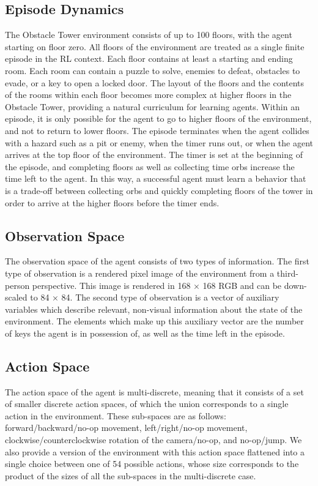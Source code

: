 \documentclass[conference]{IEEEtran}
\begin{document}
\subsection{\textbf{Episode Dynamics}}
The Obstacle Tower environment consists of up to 100 floors, with the agent starting on floor zero. All floors of the environment are treated as a single finite episode in the RL context. Each floor contains at least a starting and ending room. Each room can contain a puzzle to solve, enemies to defeat, obstacles to evade, or a key to open a locked door. The layout of the floors and the contents of the rooms within each floor becomes more complex at higher floors in the Obstacle Tower, providing a natural curriculum for learning agents. Within an episode, it is only possible for the agent to go to higher floors of the environment, and not to return to lower floors.
The episode terminates when the agent collides with a hazard such as a pit or enemy, when the timer runs out, or when the agent arrives at the top floor of the environment. The timer is set at the beginning of the episode, and completing floors as well as collecting time orbs increase the time left to
the agent. In this way, a successful agent must learn a behavior that is a trade-off between collecting orbs and quickly completing floors of the tower in order to arrive at the higher floors before the timer ends.

\subsection{\textbf{Observation Space}}
The observation space of the agent consists of two types of information. The first type of observation is a rendered pixel image of the environment from a third-person perspective.
This image is rendered in 168 × 168 RGB and can be down-scaled to 84 × 84. The second type of observation is a vector of auxiliary variables which describe relevant, non-visual information about the state of the environment. The elements which make up this auxiliary vector are the number of keys the agent is in possession of, as well as the time left in the episode.

\subsection{\textbf{Action Space}}
The action space of the agent is multi-discrete, meaning that it consists of a set of smaller discrete action spaces, of which the union corresponds to a single action in the environment. These sub-spaces are as follows: forward/backward/no-op movement, left/right/no-op movement, clockwise/counterclockwise rotation of the camera/no-op, and no-op/jump. We also provide a version of the environment with this action space flattened into a single choice between one of 54 possible actions, whose size corresponds to the product of the sizes of all the sub-spaces in the multi-discrete case.
\end{document}
